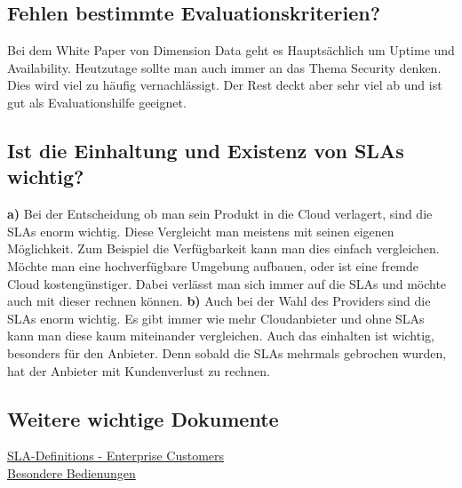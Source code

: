 \subsection{Fehlen bestimmte Evaluationskriterien?}
Bei dem White Paper von Dimension Data geht es Hauptsächlich um Uptime und Availability. Heutzutage sollte man auch immer an das Thema Security denken. Dies wird viel zu häufig vernachlässigt. Der Rest deckt aber sehr viel ab und ist gut als Evaluationshilfe geeignet. 
\subsection{Ist die Einhaltung und Existenz von SLAs wichtig?}
\textbf{a)}
Bei der Entscheidung ob man sein Produkt in die Cloud verlagert, sind die SLAs enorm wichtig. Diese Vergleicht man meistens mit seinen eigenen Möglichkeit. Zum Beispiel die Verfügbarkeit kann man dies einfach vergleichen. Möchte man eine hochverfügbare Umgebung aufbauen, oder ist eine fremde Cloud kostengünstiger. Dabei verlässt man sich immer auf die SLAs und möchte auch mit dieser rechnen können. 
\textbf{b)}
Auch bei der Wahl des Providers sind die SLAs enorm wichtig. Es gibt immer wie mehr Cloudanbieter und ohne SLAs kann man diese kaum miteinander vergleichen. Auch das einhalten ist wichtig, besonders für den Anbieter. Denn sobald die SLAs mehrmals gebrochen wurden, hat der Anbieter mit Kundenverlust zu rechnen.
\subsection{Weitere wichtige Dokumente}
\href{"https://developer.swisscom.com/terms/SLADefinitions-en.pdf"}{SLA-Definitions - Enterprise Customers}\\
\href{"https://www.swisscom.ch/content/dam/swisscom/de/biz/sme/mykmuoffice/pdf/SLA_Besondere_Bedingungen_dt.pdf"}{Besondere Bedienungen}

